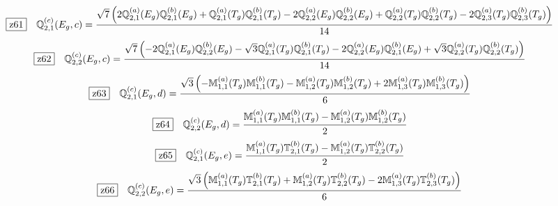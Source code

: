 \documentclass[fleqn,10pt,landscape]{jsarticle}
\begin{document}
\begin{dmath*}
\hspace*{3mm}\fbox{z61}\quad \mathbb{Q}_{2,1}^{(c)}(E_{g},c)=\frac{\sqrt{7} \left(2 \mathbb{Q}_{2,1}^{(a)}(E_{g}) \mathbb{Q}_{2,1}^{(b)}(E_{g}) + \mathbb{Q}_{2,1}^{(a)}(T_{g}) \mathbb{Q}_{2,1}^{(b)}(T_{g}) - 2 \mathbb{Q}_{2,2}^{(a)}(E_{g}) \mathbb{Q}_{2,2}^{(b)}(E_{g}) + \mathbb{Q}_{2,2}^{(a)}(T_{g}) \mathbb{Q}_{2,2}^{(b)}(T_{g}) - 2 \mathbb{Q}_{2,3}^{(a)}(T_{g}) \mathbb{Q}_{2,3}^{(b)}(T_{g})\right)}{14}
\end{dmath*}
\begin{dmath*}
\hspace*{3mm}\fbox{z62}\quad \mathbb{Q}_{2,2}^{(c)}(E_{g},c)=\frac{\sqrt{7} \left(- 2 \mathbb{Q}_{2,1}^{(a)}(E_{g}) \mathbb{Q}_{2,2}^{(b)}(E_{g}) - \sqrt{3} \mathbb{Q}_{2,1}^{(a)}(T_{g}) \mathbb{Q}_{2,1}^{(b)}(T_{g}) - 2 \mathbb{Q}_{2,2}^{(a)}(E_{g}) \mathbb{Q}_{2,1}^{(b)}(E_{g}) + \sqrt{3} \mathbb{Q}_{2,2}^{(a)}(T_{g}) \mathbb{Q}_{2,2}^{(b)}(T_{g})\right)}{14}
\end{dmath*}
\begin{dmath*}
\hspace*{3mm}\fbox{z63}\quad \mathbb{Q}_{2,1}^{(c)}(E_{g},d)=\frac{\sqrt{3} \left(- \mathbb{M}_{1,1}^{(a)}(T_{g}) \mathbb{M}_{1,1}^{(b)}(T_{g}) - \mathbb{M}_{1,2}^{(a)}(T_{g}) \mathbb{M}_{1,2}^{(b)}(T_{g}) + 2 \mathbb{M}_{1,3}^{(a)}(T_{g}) \mathbb{M}_{1,3}^{(b)}(T_{g})\right)}{6}
\end{dmath*}
\begin{dmath*}
\hspace*{3mm}\fbox{z64}\quad \mathbb{Q}_{2,2}^{(c)}(E_{g},d)=\frac{\mathbb{M}_{1,1}^{(a)}(T_{g}) \mathbb{M}_{1,1}^{(b)}(T_{g}) - \mathbb{M}_{1,2}^{(a)}(T_{g}) \mathbb{M}_{1,2}^{(b)}(T_{g})}{2}
\end{dmath*}
\begin{dmath*}
\hspace*{3mm}\fbox{z65}\quad \mathbb{Q}_{2,1}^{(c)}(E_{g},e)=\frac{\mathbb{M}_{1,1}^{(a)}(T_{g}) \mathbb{T}_{2,1}^{(b)}(T_{g}) - \mathbb{M}_{1,2}^{(a)}(T_{g}) \mathbb{T}_{2,2}^{(b)}(T_{g})}{2}
\end{dmath*}
\begin{dmath*}
\hspace*{3mm}\fbox{z66}\quad \mathbb{Q}_{2,2}^{(c)}(E_{g},e)=\frac{\sqrt{3} \left(\mathbb{M}_{1,1}^{(a)}(T_{g}) \mathbb{T}_{2,1}^{(b)}(T_{g}) + \mathbb{M}_{1,2}^{(a)}(T_{g}) \mathbb{T}_{2,2}^{(b)}(T_{g}) - 2 \mathbb{M}_{1,3}^{(a)}(T_{g}) \mathbb{T}_{2,3}^{(b)}(T_{g})\right)}{6}
\end{dmath*}
\end{document}
